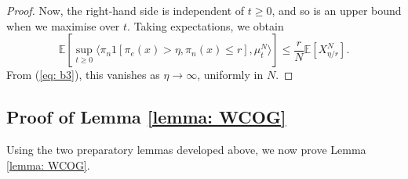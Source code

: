 \documentclass[11pt, notitlepage]{article}
\newcommand{\EE}{\ensuremath{\mathbb{E}}}
\begin{document}
\begin{proof}
Now, the right-hand side is independent of $t \ge 0$, and so is an upper bound when we maximise over $t.$ Taking expectations, we obtain
\begin{equation}
\EE\left[\sup_{t\ge 0} \bigg\langle \pi_n 1[\pi_e(x)>\eta, \pi_n(x)\leq r], \mu^N_t\bigg\rangle \right]
\leq
\frac{r}{N} \mathbb{E}\left[X^N_{\eta/r}\right].
\end{equation}
From (\ref{eq: b3}), this vanishes as $\eta\rightarrow \infty$, uniformly in $N$.
\end{proof}


\subsection{\textbf{Proof of Lemma \ref{lemma: WCOG}}} Using the two preparatory lemmas developed above, we now prove Lemma \ref{lemma: WCOG}. 
\end{document}
